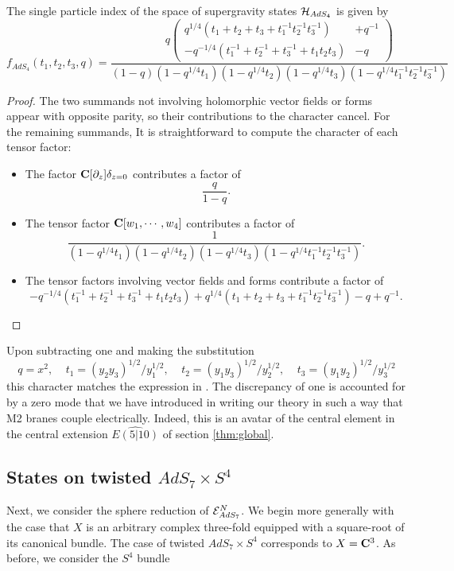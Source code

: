 \documentclass[../main.tex]{subfiles}
\begin{document}
\begin{prop}\label{prop:ads4index}
The single particle index of the space of supergravity states $\mathcal{H}_{AdS_4}$ is given by 
\[
f_{AdS_4} (t_1, t_2, t_3, q)  = \frac{q\left (\begin{aligned} q^{1/4}(t_1+ t_2 + t_3+t_1^{-1}t_2^{-1}t_3^{-1}) &+ q^{-1} \\- q^{-1/4}(t_1^{-1}+ t_2^{-1} + t_3^{-1}+t_1t_2t_3) &- q   \end{aligned}\right)}{(1-q)(1-q^{1/4}t_1)(1-q^{1/4}t_2)(1-q^{1/4}t_3)(1-q^{1/4}t_1^{-1}t_2^{-1}t_3^{-1})}
\]
\end{prop}
\begin{proof}
The two summands not involving holomorphic vector fields or forms appear with opposite parity, so their contributions to the character cancel. For the remaining summands, It is straightforward to compute the character of each tensor factor:
\begin{itemize}
\item The factor $\mathbf{C}[\partial_z]\delta_{z=0}$ contributes a factor of \[\frac{q}{1-q}.\]
\item The tensor factor $\mathbf{C}[w_1,\cdots, w_4]$ contributes a factor of \[\frac{1}{(1-q^{1/4}t_1)(1-q^{1/4}t_2)(1-q^{1/4}t_3)(1-q^{1/4}t_1^{-1}t_2^{-1}t_3^{-1})}.\]
\item The tensor factors involving vector fields and forms contribute a factor of \[-q^{-1/4}(t_1^{-1}+ t_2^{-1} + t_3^{-1}+t_1t_2t_3) + q^{1/4}(t_1+ t_2 + t_3+t_1^{-1}t_2^{-1}t_3^{-1}) - q + q^{-1}.\]
\end{itemize}
\end{proof}

\parsec[] Upon subtracting one and making the substitution
\[
q = x^2, \ \ \ \ \ t_1 = (y_2y_3)^{1/2}/y_1^{1/2}, \ \ \ \ \ t_2 = (y_1y_3)^{1/2}/y_2^{1/2}, \ \ \ \ \ t_3 = (y_1y_2)^{1/2}/y_3^{1/2}
\]
this character matches the expression in \cite[equation (2.17)]{Bhattacharya:2008zy}. The discrepancy of one is accounted for by a zero mode that we have introduced in writing our theory in such a way that M2 branes couple electrically. Indeed, this is an avatar of the central element in the central extension $\widehat{E(5|10)}$ of section \ref{thm:global}.

\subsection{States on twisted $AdS_7\times S^{4}$}
\label{s:ads7states}
Next, we consider the sphere reduction of $\mathcal{E}^N_{AdS_7}$.
We begin more generally with the case that $X$ is an arbitrary complex three-fold equipped with a square-root of its canonical bundle.
The case of twisted $AdS_7 \times S^4$ corresponds to $X = \mathbf{C}^3$.
As before, we consider the $S^4$ bundle 
\beqn\label{eqn:geomads7}
\eeqn
\end{document}

